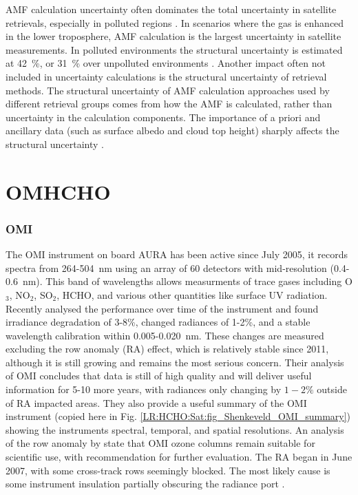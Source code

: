     AMF calculation uncertainty often dominates the total uncertainty in satellite retrievals, especially in polluted regions \parencite{Lorente2017}.
    In scenarios where the gas is enhanced in the lower troposphere, AMF calculation is the largest uncertainty in satellite measurements.
    In polluted environments the structural uncertainty is estimated at 42~\%, or 31~\% over unpolluted environments \parencite{Lorente2017}.
    Another impact often not included in uncertainty calculations is the structural uncertainty of retrieval methods.
    The structural uncertainty of AMF calculation approaches used by different retrieval groups comes from how the AMF is calculated, rather than uncertainty in the calculation components.
    The importance of a priori and ancillary data (such as surface albedo and cloud top height) sharply affects the structural uncertainty \parencite{Lorente2017}.


\section{OMHCHO}
\label{Model:omhcho}


\subsubsection{OMI}

  The OMI instrument on board AURA has been active since July 2005, it records spectra from 264-504~nm using an array of 60 detectors with mid-resolution (0.4-0.6~nm).
  This band of wavelengths allows measurments of trace gases including O$_3$, NO$_2$, SO$_2$, HCHO, and various other quantities like surface UV radiation.
  Recently \textcite{Schenkeveld2017} analysed the performance over time of the instrument and found irradiance degradation of 3-8\%, changed radiances of 1-2\%, and a stable wavelength calibration within 0.005-0.020~nm.
  These changes are measured excluding the row anomaly (RA) effect, which is relatively stable since 2011, although it is still growing and remains the most serious concern.
  Their analysis of OMI concludes that data is still of high quality and will deliver useful information for 5-10 more years, with radiances only changing by $1-2\%$ outside of RA impacted areas.
  They also provide a useful summary of the OMI instrument (copied here in Fig. \ref{LR:HCHO:Sat:fig_Shenkeveld_OMI_summary}) showing the instruments spectral, temporal, and spatial resolutions.
  An analysis of the row anomaly by \textcite{Huang2017} state that OMI ozone columns remain suitable for scientific use, with recommendation for further evaluation.
  The RA began in June 2007, with some cross-track rows seemingly blocked. 
  The most likely cause is some instrument insulation partially obscuring the radiance port \parencite{Schenkeveld2017}.
  
